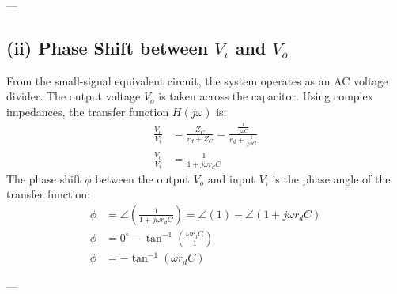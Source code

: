 \documentclass[12pt,a3paper]{article}
\begin{document}
\begin{enumerate}
\begin{tcolorbox}[enhanced,breakable,ansbox,colback=cA!4,colframe=cA,boxrule=0.8pt,arc=5pt,title={\textbf{Answer}},fonttitle=\bfseries\color{white},colbacktitle=cA]
---

\subsection*{(ii) Phase Shift between $V_i$ and $V_o$}
From the small-signal equivalent circuit, the system operates as an AC voltage divider. The output voltage $V_o$ is taken across the capacitor. Using complex impedances, the transfer function $H(j\omega)$ is:
\begin{align}
    \frac{V_o}{V_i} &= \frac{Z_C}{r_d + Z_C} = \frac{\frac{1}{j\omega C}}{r_d + \frac{1}{j\omega C}} \\[8pt]
    \frac{V_o}{V_i} &= \frac{1}{1 + j\omega r_d C}
\end{align}
The phase shift $\phi$ between the output $V_o$ and input $V_i$ is the phase angle of the transfer function:
\begin{align}
    \phi &= \angle \left( \frac{1}{1 + j\omega r_d C} \right) = \angle(1) - \angle(1 + j\omega r_d C) \\[8pt]
    \phi &= 0^\circ - \tan^{-1}\left( \frac{\omega r_d C}{1} \right) \\[8pt]
    \phi &= -\tan^{-1}(\omega r_d C)
\end{align}

---


\end{tcolorbox}
\end{enumerate}
\end{document}
